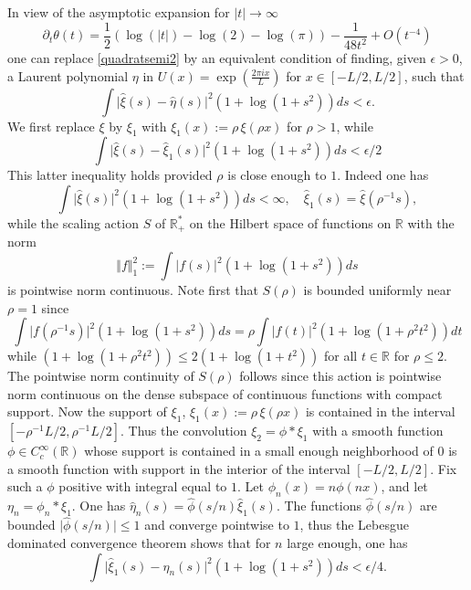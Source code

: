 \documentclass[cupthm]{CUP-JNL-JMJ}
\def\R{{\mathbb R}}
\numberwithin{equation}{section}
\theoremstyle{cupplain}
\theoremstyle{cupdefinition}
\theoremstyle{cupremark}
\theoremstyle{cupproof}
\begin{document}
 In view of the asymptotic expansion  for $\vert t\vert \to \infty$  
$$
\partial_t\theta(t)=\frac{1}{2} (\log (\vert t\vert)-\log (2)-\log (\pi ))-\frac{1}{48 t^2}+O\left(t^{-4}\right)
$$
one can replace \eqref{quadratsemi2} by an equivalent condition of finding, given $\epsilon>0$, a Laurent polynomial $\eta$ in $U(x)=\exp(\frac{2\pi i x}{L})$ for $x\in [-L/2,L/2]$, such that  
\begin{equation}\label{quadratsemi3}
  \int\vert {\widehat \xi}(s)-{\widehat \eta}(s)\vert^2 (1+\log (1+s^2))ds<\epsilon.
\end{equation}
 We first replace $\xi$ by $\xi_1$ with $\xi_1(x):=\rho\,\xi(\rho x)$ for $\rho>1$, while  
 \begin{equation}\label{quadratsemi4}
  \int\vert {\widehat \xi}(s)-{\widehat \xi_1}(s)\vert^2 (1+\log (1+s^2))ds<\epsilon/2
\end{equation}
This latter inequality  holds provided $\rho$ is close enough to $1$. Indeed one has 
$$
\int\vert {\widehat \xi}(s)\vert^2 (1+\log (1+s^2))ds<\infty, \quad{\widehat \xi_1}(s)={\widehat \xi}(\rho^{-1}s),
$$
while the scaling action $S$ of $\R_+^*$ on the Hilbert space of functions on $\R$ with the norm
$$
\Vert f\Vert_1^2:=\int\vert f(s)\vert^2 (1+\log (1+s^2))ds
$$
is pointwise norm continuous. Note first that $S(\rho)$ is bounded uniformly near $\rho=1$ since 
$$
\int\vert f(\rho^{-1}s)\vert^2 (1+\log (1+s^2))ds=\rho\int\vert f(t)\vert^2 (1+\log (1+\rho^2t^2))dt
$$
while $(1+\log (1+\rho^2t^2))\leq 2(1+\log (1+t^2))$ for all $t\in \R$  for $\rho\leq 2$. The pointwise norm continuity of $S(\rho)$ follows since this action is pointwise norm continuous on the dense subspace of continuous functions with compact support. Now the support of $\xi_1$, $\xi_1(x):=\rho\,\xi(\rho x)$ is contained in the interval $[-\rho^{-1}L/2, \rho^{-1}L/2]$. Thus the convolution $\xi_2=\phi*\xi_1$ with a smooth function $\phi\in C_c^{\infty}(\R)$ whose support is contained in a small enough neighborhood of $0$ is a smooth function with support in the interior of the interval 
$[-L/2,L/2]$. Fix such a $\phi$ positive with integral equal to $1$. Let $\phi_n(x)=n\phi(nx)$, and let $\eta_n=\phi_n*\xi_1$. One has $\widehat \eta_n(s)=\widehat \phi(s/n)\widehat\xi_1(s)$.  The functions $\widehat \phi(s/n)$ are bounded  $\vert\widehat \phi(s/n)\vert\leq 1$ and converge pointwise to $1$, thus the Lebesgue dominated convergence theorem shows that for $n$ large enough, one has
 \begin{equation}\label{quadratsemi5}
  \int\vert {\widehat \xi_1}(s)-{\widehat \eta_n}(s)\vert^2 (1+\log (1+s^2))ds<\epsilon/4.
\end{equation}
\end{document}
